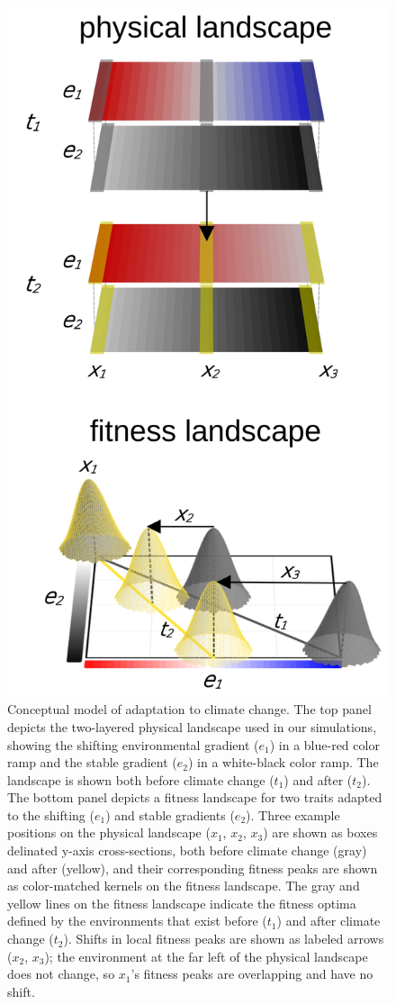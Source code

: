 \documentclass[9pt,twocolumn,twoside,lineno]{new_article}
\begin{document}
\begin{figure}%
\centering
\includegraphics[width=.8\linewidth]{pub/figs_and_stats/FIG_1_conceptual.png}
    \caption{Conceptual model of adaptation to climate change. The top panel depicts the two-layered physical landscape used in our simulations, showing the shifting environmental gradient ($e_{1}$) in a blue-red color ramp and the stable gradient ($e_{2}$) in a white-black color ramp. The landscape is shown both before climate change ($t_{1}$) and after ($t_{2}$). The bottom panel depicts a fitness landscape for two traits adapted to the shifting ($e_{1}$) and stable gradients ($e_{2}$). Three example positions on the physical landscape ($x_{1}$, $x_{2}$, $x_{3}$) are shown as boxes delinated y-axis cross-sections, both before climate change (gray) and after (yellow), and their corresponding fitness peaks are shown as color-matched kernels on the fitness landscape. The gray and yellow lines on the fitness landscape indicate the fitness optima defined by the environments that exist before ($t_{1}$) and after climate change ($t_{2}$). Shifts in local fitness peaks are shown as labeled arrows ($x_{2}$, $x_{3}$); the environment at the far left of the physical landscape does not change, so $x_{1}$'s fitness peaks are overlapping and have no shift.}
\label{fig:fig_1}
\end{figure}
\end{document}
